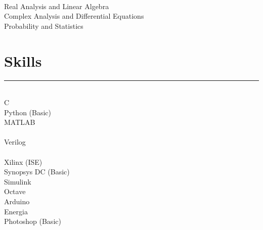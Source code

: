 \documentclass[]{resume}
\begin{document}
\begin{minipage}[t]{0.33\textwidth}
\vspace{6pt}
\\
Real Analysis and Linear Algebra\\
Complex Analysis and Differential Equations\\
Probability and Statistics\\
\sectionsep
\section{Skills}
\vspace{-0.5em}
\noindent\rule{5cm}{0.4pt}

\\
C\\
Python (Basic)\\
MATLAB\\

\vspace{6pt}
\\
Verilog\\

\vspace{6pt}
\\
Xilinx (ISE)\\
Synopsys DC (Basic)\\
Simulink\\
Octave\\
Arduino\\
Energia\\
Photoshop (Basic)\\
\sectionsep

%
%

\end{minipage} 
\hfill
\end{document}
